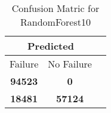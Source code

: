 \begin{table}[] 
\caption{Confusion Matric for RandomForest10} 
\label{Table: Prediction Accuracy-DMDRandomForest10OnlySunEKF-ignoreReflectionperfectNoFailurePrediction-Reflection} 
\centering 
\begin{tabular} 
 {@{}ccc@{}} 
\toprule 
\multicolumn{2}{c}{\textbf{Predicted}}
 \\ \midrule 
\multicolumn{1}{|c|}{Failure} & 
\multicolumn{1}{c|}{No Failure}
 \\ \midrule 
\multicolumn{1}{|c|}{\color{green}\textbf{94523}} & 
\multicolumn{1}{c|}{\color{red}\textbf{0}}
 \\ \midrule 
\multicolumn{1}{|c|}{\color{red}\textbf{18481}} & 
\multicolumn{1}{c|}{\color{green}\textbf{57124}}
 \\ \bottomrule 
\end{tabular} 
\end{table} 

